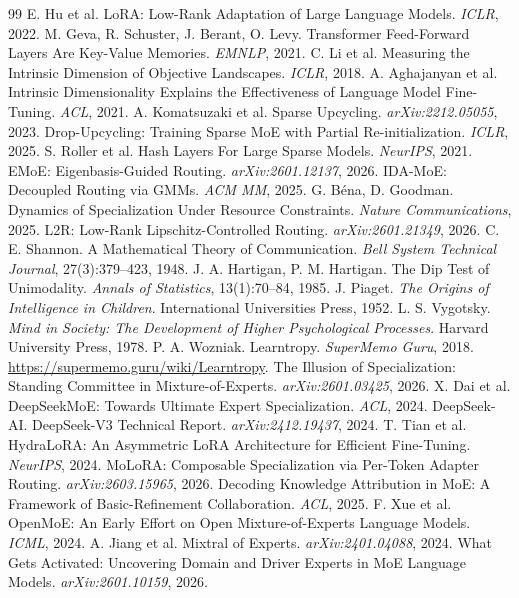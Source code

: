 \documentclass{article}
\begin{document}
\begin{thebibliography}{99}
 E. Hu et al. LoRA: Low-Rank Adaptation of Large Language Models. \textit{ICLR}, 2022.
 M. Geva, R. Schuster, J. Berant, O. Levy. Transformer Feed-Forward Layers Are Key-Value Memories. \textit{EMNLP}, 2021.
 C. Li et al. Measuring the Intrinsic Dimension of Objective Landscapes. \textit{ICLR}, 2018.
 A. Aghajanyan et al. Intrinsic Dimensionality Explains the Effectiveness of Language Model Fine-Tuning. \textit{ACL}, 2021.
 A. Komatsuzaki et al. Sparse Upcycling. \textit{arXiv:2212.05055}, 2023.
 Drop-Upcycling: Training Sparse MoE with Partial Re-initialization. \textit{ICLR}, 2025.
 S. Roller et al. Hash Layers For Large Sparse Models. \textit{NeurIPS}, 2021.
 EMoE: Eigenbasis-Guided Routing. \textit{arXiv:2601.12137}, 2026.
 IDA-MoE: Decoupled Routing via GMMs. \textit{ACM MM}, 2025.
 G. B\'{e}na, D. Goodman. Dynamics of Specialization Under Resource Constraints. \textit{Nature Communications}, 2025.
 L2R: Low-Rank Lipschitz-Controlled Routing. \textit{arXiv:2601.21349}, 2026.
 C. E. Shannon. A Mathematical Theory of Communication. \textit{Bell System Technical Journal}, 27(3):379--423, 1948.
 J. A. Hartigan, P. M. Hartigan. The Dip Test of Unimodality. \textit{Annals of Statistics}, 13(1):70--84, 1985.
 J. Piaget. \textit{The Origins of Intelligence in Children}. International Universities Press, 1952.
 L. S. Vygotsky. \textit{Mind in Society: The Development of Higher Psychological Processes}. Harvard University Press, 1978.
 P. A. Wozniak. Learntropy. \textit{SuperMemo Guru}, 2018. \url{https://supermemo.guru/wiki/Learntropy}.
 The Illusion of Specialization: Standing Committee in Mixture-of-Experts. \textit{arXiv:2601.03425}, 2026.
 X. Dai et al. DeepSeekMoE: Towards Ultimate Expert Specialization. \textit{ACL}, 2024.
 DeepSeek-AI. DeepSeek-V3 Technical Report. \textit{arXiv:2412.19437}, 2024.
 T. Tian et al. HydraLoRA: An Asymmetric LoRA Architecture for Efficient Fine-Tuning. \textit{NeurIPS}, 2024.
 MoLoRA: Composable Specialization via Per-Token Adapter Routing. \textit{arXiv:2603.15965}, 2026.
 Decoding Knowledge Attribution in MoE: A Framework of Basic-Refinement Collaboration. \textit{ACL}, 2025.
 F. Xue et al. OpenMoE: An Early Effort on Open Mixture-of-Experts Language Models. \textit{ICML}, 2024.
 A. Jiang et al. Mixtral of Experts. \textit{arXiv:2401.04088}, 2024.
 What Gets Activated: Uncovering Domain and Driver Experts in MoE Language Models. \textit{arXiv:2601.10159}, 2026.
\end{thebibliography}
\end{document}
